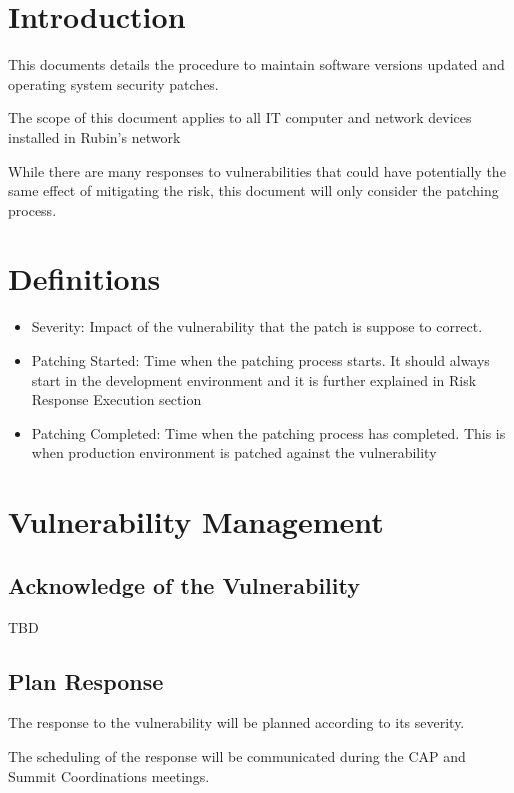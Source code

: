 \section{Introduction}

This documents details the procedure to maintain software versions updated and operating system security patches. 

The scope of this document applies to all IT computer and network devices installed in Rubin's network

While there are many responses to vulnerabilities that could have potentially the same effect of mitigating the risk, this document will only consider the patching process. 


\section{Definitions}

\begin{itemize}
    \item Severity: Impact of the vulnerability that the patch is suppose to correct. 
    \item Patching Started: Time when the patching process starts. It should always start in the development environment and it is further explained in Risk Response Execution section 
    \item Patching Completed: Time when the patching process has completed. This is when production environment is patched against the vulnerability
\end{itemize}

\section{Vulnerability Management}

\subsection{Acknowledge of the Vulnerability}

TBD

\subsection{Plan Response}

The response to the vulnerability will be planned according to its severity.

The scheduling of the response will be communicated during the CAP and Summit Coordinations meetings. 


